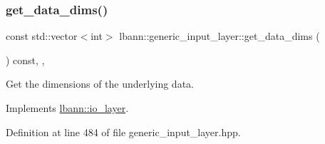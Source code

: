 \subsubsection{\texorpdfstring{get\+\_\+data\+\_\+dims()}{get\_data\_dims()}}
{\footnotesize\ttfamily const std\+::vector$<$int$>$ lbann\+::generic\+\_\+input\+\_\+layer\+::get\+\_\+data\+\_\+dims (\begin{DoxyParamCaption}{ }\end{DoxyParamCaption}) const\hspace{0.3cm}{\ttfamily [inline]}, {\ttfamily [override]}, {\ttfamily [virtual]}}

Get the dimensions of the underlying data. 

Implements \hyperlink{classlbann_1_1io__layer_a67feb9fd903ef4d2ca782bbe7860a413}{lbann\+::io\+\_\+layer}.



Definition at line 484 of file generic\+\_\+input\+\_\+layer.\+hpp.


